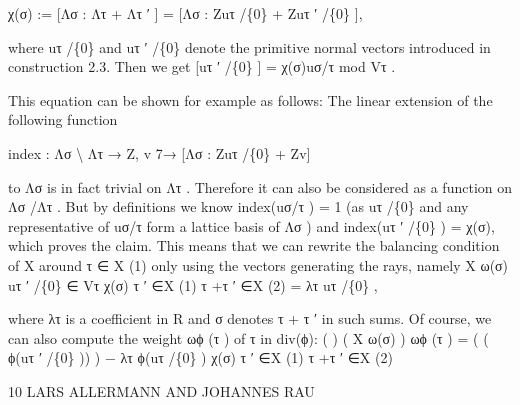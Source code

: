 \documentclass[
  11pt,
]{article}
\newenvironment{Shaded}{}{}
\newcommand{\NormalTok}[1]{#1}
\begin{document}
\begin{Shaded}
\begin{Highlighting}[]
\NormalTok{                 χ(σ) := [Λσ : Λτ + Λτ ′ ] = [Λσ : Zuτ /\{0\} + Zuτ ′ /\{0\} ],}

\NormalTok{where uτ /\{0\} and uτ ′ /\{0\} denote the primitive normal vectors introduced in construction}
\NormalTok{2.3. Then we get}
\NormalTok{                             [uτ ′ /\{0\} ] = χ(σ)uσ/τ           mod Vτ .}

\NormalTok{This equation can be shown for example as follows: The linear extension of the following}
\NormalTok{function}

\NormalTok{                       index : Λσ \textbackslash{} Λτ           → Z,}
\NormalTok{                                           v     7→ [Λσ : Zuτ /\{0\} + Zv]}

\NormalTok{to Λσ is in fact trivial on Λτ . Therefore it can also be considered as a function on Λσ /Λτ .}
\NormalTok{But by definitions we know index(uσ/τ ) = 1 (as uτ /\{0\} and any representative of uσ/τ}
\NormalTok{form a lattice basis of Λσ ) and index(uτ ′ /\{0\} ) = χ(σ), which proves the claim.}
\NormalTok{This means that we can rewrite the balancing condition of X around τ ∈ X (1) only using}
\NormalTok{the vectors generating the rays, namely}
\NormalTok{                             X           ω(σ)}
\NormalTok{                                              uτ ′ /\{0\}    ∈     Vτ}
\NormalTok{                                         χ(σ)}
\NormalTok{                           τ ′ ∈X (1)}
\NormalTok{                         τ +τ ′ ∈X (2)}
\NormalTok{                                                           = λτ uτ /\{0\} ,}

\NormalTok{where λτ is a coefficient in R and σ denotes τ + τ ′ in such sums. Of course, we can also}
\NormalTok{compute the weight ωϕ (τ ) of τ in div(ϕ):}
\NormalTok{                           (                            )}
\NormalTok{                           (       X           ω(σ)              )}
\NormalTok{                 ωϕ (τ ) = (}
\NormalTok{                           (                        ϕ(uτ ′ /\{0\} ))}
\NormalTok{                                                                 ) − λτ ϕ(uτ /\{0\} )}
\NormalTok{                                               χ(σ)}
\NormalTok{                                 τ ′ ∈X (1)}
\NormalTok{                               τ +τ ′ ∈X (2)}

\NormalTok{10                            LARS ALLERMANN AND JOHANNES RAU}



\end{Highlighting}
\end{Shaded}
\end{document}
